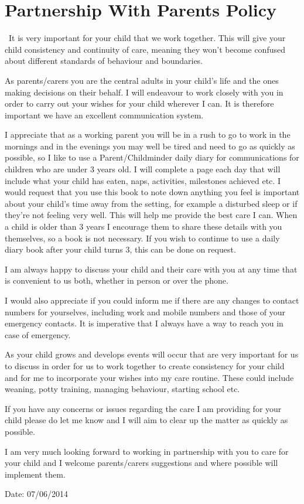 \documentclass[10pt]{article}
\begin{document}
\section{Partnership With Parents Policy}

~It is very important for your child that we work together. This will
give your child consistency and continuity of care, meaning they won't
become confused about different standards of behaviour and boundaries.

As parents/carers you are the central adults in your child's life and
the ones making decisions on their behalf. I will endeavour to work
closely with you in order to carry out your wishes for your child
wherever I can. It is therefore important we have an excellent
communication system.

I appreciate that as a working parent you will be in a rush to go to
work in the mornings and in the evenings you may well be tired and need
to go as quickly as possible, so I like to use a Parent/Childminder
daily diary for communications for children who are under 3 years old. I
will complete a page each day that will include what your child has
eaten, naps, activities, milestones achieved etc. I would request that
you use this book to note down anything you feel is important about your
child's time away from the setting, for example a disturbed sleep or if
they're not feeling very well. This will help me provide the best care I
can. When a child is older than 3 years I encourage them to share these
details with you themselves, so a book is not necessary. If you wish to
continue to use a daily diary book after your child turns 3, this can be
done on request.

I am always happy to discuss your child and their care with you at any
time that is convenient to us both, whether in person or over the phone.

I would also appreciate if you could inform me if there are any changes
to contact numbers for yourselves, including work and mobile numbers and
those of your emergency contacts. It is imperative that I always have a
way to reach you in case of emergency.

As your child grows and develops events will occur that are very
important for us to discuss in order for us to work together to create
consistency for your child and for me to incorporate your wishes into my
care routine. These could include weaning, potty training, managing
behaviour, starting school etc.

If you have any concerns or issues regarding the care I am providing for
your child please do let me know and I will aim to clear up the matter
as quickly as possible.

I am very much looking forward to working in partnership with you to
care for your child and I welcome parents/carers suggestions and where
possible will implement them.

Date: 07/06/2014

~
\end{document}
